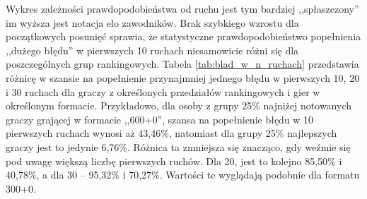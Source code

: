 \documentclass[inzynierska]{pwr_wmat_praca_dyplomowa}
\theoremstyle{plain}
\numberwithin{theorem}{chapter}
\theoremstyle{definition}
\numberwithin{theorem}{chapter}
\begin{document}
Wykres zależności prawdopodobieństwa od ruchu jest tym bardziej ,,spłaszczony'' im wyższa jest notacja elo zawodników. Brak szybkiego wzrostu dla początkowych posunięć sprawia, że statystyczne prawdopodobieństwo popełnienia ,,dużego błędu'' w pierwszych 10 ruchach niesamowicie różni się dla poszczególnych grup rankingowych. Tabela \ref{tab:blad_w_n_ruchach} przedstawia różnicę w szansie na popełnienie przynajmniej jednego błędu w pierwszych 10, 20 i 30 ruchach dla graczy z określonych przedziałów rankingowych i gier w określonym formacie. Przykładowo, dla osoby z grupy 25\% najniżej notowanych graczy grającej w formacie ,,600+0'', szansa na popełnienie błędu w 10 pierwszych ruchach wynosi aż 43,46\%, natomiast dla grupy 25\% najlepszych graczy jest to jedynie 6,76\%. Różnica ta zmniejsza się znacząco, gdy weźmie się pod uwagę większą liczbę pierwszych ruchów. Dla 20, jest to kolejno 85,50\% i 40,78\%, a dla 30 -- 95,32\% i 70,27\%. Wartości te wyglądają podobnie dla formatu 300+0.
\end{document}
